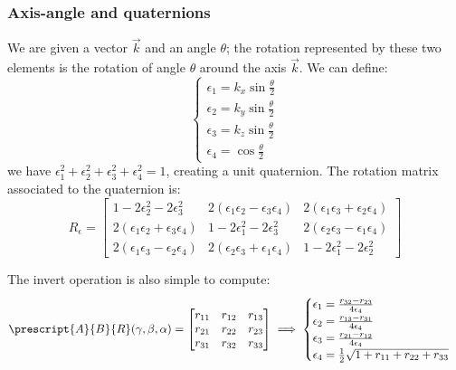 \subsubsection{Axis-angle and quaternions}
We are given a vector $\vec{k}$ and an angle $\theta$; the rotation represented by these two elements is the rotation of angle $\theta$ around the axis $\vec{k}$. We can define:
\begin{equation*}
    \begin{cases}
        \epsilon_1 = k_x\sin\frac{\theta}{2} \\
        \epsilon_2 = k_y\sin\frac{\theta}{2} \\
        \epsilon_3 = k_z\sin\frac{\theta}{2} \\
        \epsilon_4 = \cos\frac{\theta}{2}
    \end{cases}
\end{equation*}
we have $\epsilon_1^2+\epsilon_2^2+\epsilon_3^2+\epsilon_4^2=1$, creating a unit quaternion. The rotation matrix associated to the quaternion is:
\begin{equation*}
    R_\epsilon = \begin{bmatrix}
        1-2\epsilon_2^2-2\epsilon_3^2 & 2(\epsilon_1\epsilon_2-\epsilon_3\epsilon_4) & 2(\epsilon_1\epsilon_3+\epsilon_2\epsilon_4) \\
        2(\epsilon_1\epsilon_2+\epsilon_3\epsilon_4) & 1-2\epsilon_1^2-2\epsilon_3^2 & 2(\epsilon_2\epsilon_3-\epsilon_1\epsilon_4) \\
        2(\epsilon_1\epsilon_3-\epsilon_2\epsilon_4) & 2(\epsilon_2\epsilon_3+\epsilon_1\epsilon_4) & 1-2\epsilon_1^2-2\epsilon_2^2
    \end{bmatrix}
\end{equation*}

The invert operation is also simple to compute:
\begin{align*}
    \prescript{A}{B}{R}(\gamma, \beta, \alpha) = \begin{bmatrix}
        r_{11} & r_{12} & r_{13} \\
        r_{21} & r_{22} & r_{23} \\
        r_{31} & r_{32} & r_{33}
    \end{bmatrix}
    \implies
    \begin{cases}
        \epsilon_1 = \frac{r_{32}-r_{23}}{4\epsilon_4} \\
        \epsilon_2 = \frac{r_{13}-r_{31}}{4\epsilon_4} \\
        \epsilon_3 = \frac{r_{21}-r_{12}}{4\epsilon_4} \\
        \epsilon_4 = \frac{1}{2}\sqrt{1+r_{11}+r_{22}+r_{33}}
    \end{cases}
\end{align*}


